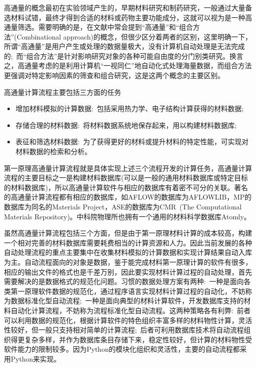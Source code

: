 \frame
{
	\frametitle{}
高通量的概念最初在实验领域产生的，早期材料研究和制药研究，一般通过大量备选材料试错，最终才得到合适的材料或药物主要功能成分，这就可以视为是一种高通量筛选。需要明确的是，在文献中常会提到“高通量”和“组合方法”(\textrm{Combinational approach})的概念，但很少区分着两者的区别，这里明确一下，所谓“高通量”是用户产生或处理的数据量极大，没有计算机自动处理是无法完成的;~而“组合方法”是针对影响研究对象的各种可能自由度的分门别类研究。换言之，高通量考虑的是利用计算机“一视同仁”地自动化式处理海量数据，而组合方法更强调对特定影响因素的筛查和组合研究，这是这两个概念的主要区别。

高通量计算流程主要包括三方面的任务
\begin{itemize}
	\item 增加材料模拟的计算数据:~包括采用热力学、电子结构计算获得的材料数据;
	\item 存储合理的材料数据:~将材料数据系统地保存起来，用以构建材料数据库;
	\item 表征和筛选材料数据:~为了获得更好的材料或提升材料的特定性能，可实现对材料数据的检索和分析。
\end{itemize}
第一原理高通量计算流程就是具体实现上述三个流程开发的计算任务，高通量计算流程的主要目标之一是构建材料数据库(可以是一般的通用材料数据库或特定目标的材料数据库)，所以高通量计算软件与相应的数据库有着密不可分的关联。著名的高通量计算流程都有相应的数据库，如\textrm{AFLOW}的数据库为\textrm{AFLOWLIB}\cite{CMS58-227_2012,AFLOWORG_URL}，\textrm{MP}的数据库为同名的\textrm{Materials Project}\cite{CMS50-2295_2011,MP_URL}，\textrm{ASE}的数据库为\textrm{CMR~(The Computational Materials Repository)}\cite{CSE14-51_2012,CMR_URL}。中科院物理所也拥有一个通用的材料科学数据库\textrm{Atomly}\cite{ATOMLY_URL}。

虽然高通量计算流程包括三个方面，但是由于第一原理材料计算的成本较高，构建一个相对完善的材料数据库需要耗费相当的计算资源和人力。因此当前发展的各种自动处理流程的重点主要集中在收集材料模拟的计算数据和实现计算结果自动入库为主。自动流程面向的对象是数据，鉴于能完成材料第一原理计算的软件有很多，相应的输出文件的格式也是千差万别，因此要实现材料计算过程的自动处理，首先需要解决的是数据格式的规范化问题。习惯的数据处理方案有两种:~一种是面向各类第一原理软件数据的规范化，通过程序语言实现材料计算过程的自动化，不妨称为数据标准化型自动流程;~一种是面向典型的材料计算软件，开发数据库支持的材料自动化计算流程，不妨称为流程标准化型自动流程。这两种策略各有利弊:~前者可以利用数据的规范化，根据计算软件的特色组织丰富多样的材料物性计算，灵活性较好，但一般只支持相对简单的计算流程;~后者可利用数据库技术将自动流程组织得更复杂多样，并作为数据库条目存储下来，稳定性较好，但计算的材料物性受软件能力的限制较多。因为\textrm{Python}\cite{Python_URL}的模块化组织和灵活性，主要的自动流程都采用\textrm{Python}来实现。
}

